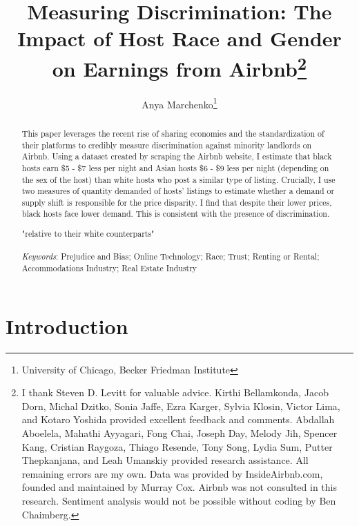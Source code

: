 \documentclass[11pt, oneside]{article}
\begin{document}
	
	
	\title{Measuring Discrimination: The Impact of Host Race and Gender on Earnings from Airbnb\footnote
		{I thank Steven D. Levitt for valuable advice. Kirthi Bellamkonda, Jacob Dorn, Michal Dzitko, Sonia Jaffe, Ezra Karger, Sylvia Klosin, Victor Lima, and Kotaro Yoshida provided excellent feedback and comments. Abdallah Aboelela, Mahathi Ayyagari, Fong Chai, Joseph Day, Melody Jih, Spencer Kang, Cristian Raygoza, Thiago Resende, Tony Song, Lydia Sum, Putter Thepkanjana, and Leah Umanskiy provided research assistance. All remaining errors are my own. Data was provided by InsideAirbnb.com, founded and maintained by Murray Cox. Airbnb was not consulted in this research. Sentiment analysis would not be possible without coding by Ben Chaimberg.}}
	\author{Anya Marchenko\footnote{University of Chicago, Becker Friedman Institute}}
	\maketitle
	
	\begin{abstract}
		This paper leverages the recent rise of sharing economies and the standardization of their platforms to credibly measure discrimination against minority landlords on Airbnb. Using a dataset created by scraping the Airbnb website, I estimate that black hosts earn \$5 - \$7 less per night and Asian hosts \$6 - \$9 less per night (depending on the sex of the host) than white hosts who post a similar type of listing. Crucially, I use two measures of quantity demanded of hosts' listings to estimate whether a demand or supply shift is responsible for the price disparity. I find that despite their lower prices, black hosts face lower demand. This is consistent with the presence of discrimination. 
		
		"relative to their white counterparts"
		\\\\
		\textit{Keywords}: Prejudice and Bias; Online Technology; Race; Trust; Renting or Rental; Accommodations Industry; Real Estate Industry
		
	\end{abstract}
	
	\newpage
	
	\doublespacing
	\section{Introduction}
	
	\label{lit}
	
\end{document}
